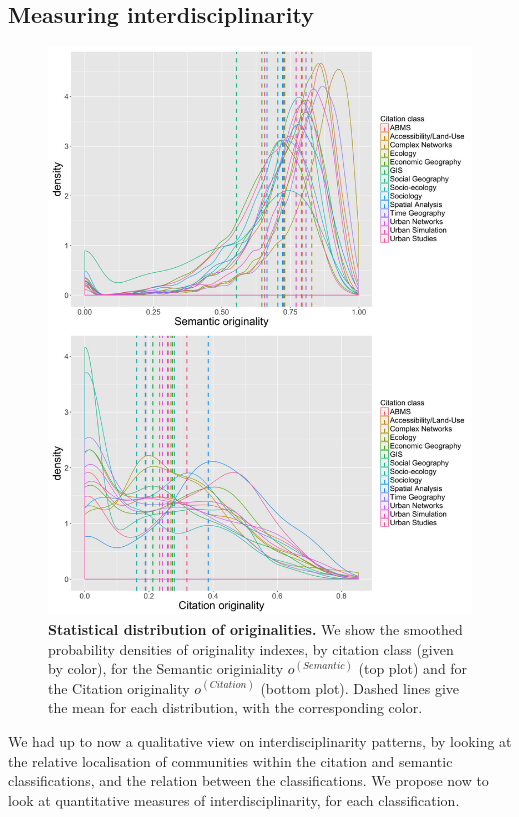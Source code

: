 \subsection*{Measuring interdisciplinarity}


\begin{figure}
\centering
\includegraphics[width=1.3\textwidth]{figures/Fig10.jpg}
\caption{\textbf{Statistical distribution of originalities.} We show the smoothed probability densities of originality indexes, by citation class (given by color), for the Semantic originiality $o^{(Semantic)}$ (top plot) and for the Citation originality $o^{(Citation)}$ (bottom plot). Dashed lines give the mean for each distribution, with the corresponding color.}
\label{fig:firstorderint}
\end{figure}


We had up to now a qualitative view on interdisciplinarity patterns, by looking at the relative localisation of communities within the citation and semantic classifications, and the relation between the classifications. We propose now to look at quantitative measures of interdisciplinarity, for each classification.


